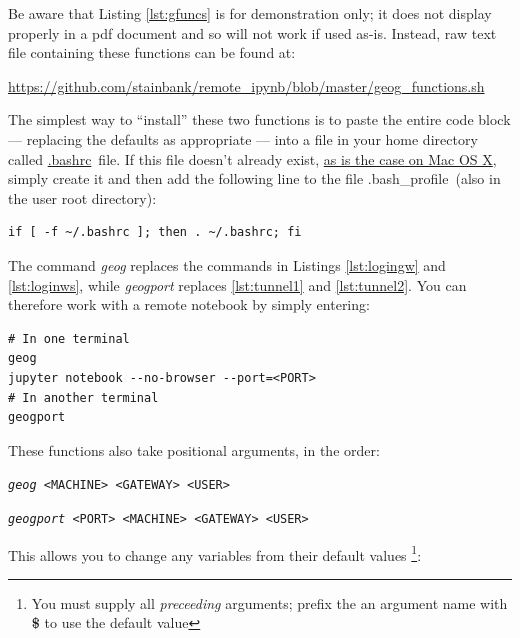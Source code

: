 \documentclass[a4paper]{article}
\begin{document}


Be aware that Listing \ref{lst:gfuncs} is for demonstration only; it does not display properly in a pdf document and so will not work if used as-is.
Instead, raw text file containing these functions can be found at:

\noindent\small\url{https://github.com/stainbank/remote_ipynb/blob/master/geog_functions.sh}

The simplest way to ``install'' these two functions is to paste the entire code block --- replacing the defaults as appropriate --- into a file in your home directory called \href{http://superuser.com/questions/49289/what-is-the-bashrc-file}{.bashrc}~file.
If this file doesn't already exist, \href{http://apple.stackexchange.com/a/119714}{as is the case on Mac OS X}, simply create it and then add the following line to the file .bash\_profile~(also in the user root directory):

\begin{lstlisting}[caption={Source .bashrc on startup}, label={lst:srcbashrc}]
if [ -f ~/.bashrc ]; then . ~/.bashrc; fi
\end{lstlisting}

The command \emph{geog} replaces the commands in Listings \ref{lst:logingw} and \ref{lst:loginws}, while \emph{geogport} replaces \ref{lst:tunnel1} and \ref{lst:tunnel2}.
You can therefore work with a remote notebook by simply entering:
\begin{lstlisting}[caption={Set up and tunnel to remote Notebook server}, label={lst:usegfuncs}]
# In one terminal
geog
jupyter notebook --no-browser --port=<PORT>
# In another terminal
geogport
\end{lstlisting}

These functions also take positional arguments, in the order:

\texttt{\emph{geog} \textless{}MACHINE\textgreater{} \textless{}GATEWAY\textgreater{} \textless{}USER\textgreater{}}
{}

\texttt{\emph{geogport} \textless{}PORT\textgreater{} \textless{}MACHINE\textgreater{} \textless{}GATEWAY\textgreater{} \textless{}USER\textgreater{}}

This allows you to change any variables from their default values \footnote{You must supply all \emph{preceeding} arguments; prefix the an argument name with \textbf{\$} to use the default value}:
\end{document}
